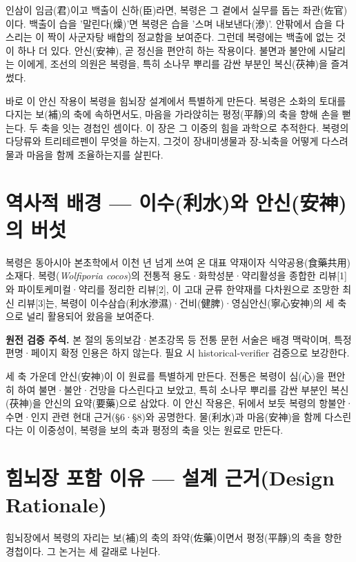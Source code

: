 \documentclass[12pt,oneside]{book}
\newenvironment{authnote}
  {\par\smallskip\begingroup\leftskip=6mm\rightskip=3mm\small\color{muted}\noindent\ignorespaces}
  {\par\endgroup\smallskip}
\begin{document}
인삼이 임금(君)이고 백출이 신하(臣)라면, 복령은 그 곁에서 실무를 돕는 좌관(佐官)이다. 백출이 습을 '말린다(燥)'면 복령은 습을 '스며 내보낸다(滲)'. 안팎에서 습을 다스리는 이 짝이 사군자탕 배합의 정교함을 보여준다. 그런데 복령에는 백출에 없는 것이 하나 더 있다. 안신(安神), 곧 정신을 편안히 하는 작용이다. 불면과 불안에 시달리는 이에게, 조선의 의원은 복령을, 특히 소나무 뿌리를 감싼 부분인 복신(茯神)을 즐겨 썼다.

바로 이 안신 작용이 복령을 힘뇌장 설계에서 특별하게 만든다. 복령은 소화의 토대를 다지는 보(補)의 축에 속하면서도, 마음을 가라앉히는 평정(平靜)의 축을 향해 손을 뻗는다. 두 축을 잇는 경첩인 셈이다. 이 장은 그 이중의 힘을 과학으로 추적한다. 복령의 다당류와 트리테르펜이 무엇을 하는지, 그것이 장내미생물과 장-뇌축을 어떻게 다스려 물과 마음을 함께 조율하는지를 살핀다.

\section{역사적 배경 — 이수(利水)와 안신(安神)의 버섯}

복령은 동아시아 본초학에서 이천 년 넘게 쓰여 온 대표 약재이자 식약공용(食藥共用) 소재다. 복령(\textit{Wolfiporia cocos})의 전통적 용도·화학성분·약리활성을 종합한 리뷰[1]와 파이토케미컬·약리를 정리한 리뷰[2], 이 고대 균류 한약재를 다차원으로 조망한 최신 리뷰[3]는, 복령이 이수삼습(利水滲濕)·건비(健脾)·영심안신(寧心安神)의 세 축으로 널리 활용되어 왔음을 보여준다.

\begin{authnote}\textbf{원전 검증 주석.} 본 절의 동의보감·본초강목 등 전통 문헌 서술은 배경 맥락이며, 특정 편명·페이지 확정 인용은 하지 않는다. 필요 시 historical-verifier 검증으로 보강한다.\end{authnote}

세 축 가운데 안신(安神)이 이 원료를 특별하게 만든다. 전통은 복령이 심(心)을 편안히 하여 불면·불안·건망을 다스린다고 보았고, 특히 소나무 뿌리를 감싼 부분인 복신(茯神)을 안신의 요약(要藥)으로 삼았다. 이 안신 작용은, 뒤에서 보듯 복령의 항불안·수면·인지 관련 현대 근거(§6·§8)와 공명한다. 물(利水)과 마음(安神)을 함께 다스린다는 이 이중성이, 복령을 보의 축과 평정의 축을 잇는 원료로 만든다.

\section{힘뇌장 포함 이유 — 설계 근거(Design Rationale)}

힘뇌장에서 복령의 자리는 보(補)의 축의 좌약(佐藥)이면서 평정(平靜)의 축을 향한 경첩이다. 그 논거는 세 갈래로 나뉜다.
\end{document}
